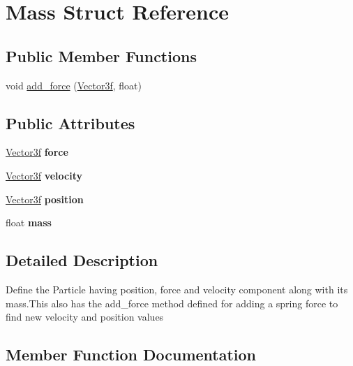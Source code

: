 \hypertarget{struct_mass}{}\section{Mass Struct Reference}
\label{struct_mass}
\subsection*{Public Member Functions}
\begin{DoxyCompactItemize}
\item 
void \mbox{\hyperlink{struct_mass_a7e47cabb99c2108fa6b5a8295967aa4f}{add\+\_\+force}} (\mbox{\hyperlink{class_vector3f}{Vector3f}}, float)
\end{DoxyCompactItemize}
\subsection*{Public Attributes}
\begin{DoxyCompactItemize}
\item 
\mbox{\label{struct_mass_a0c10550c393e04b31927ea2e19c79538}} 
\mbox{\hyperlink{class_vector3f}{Vector3f}} {\bfseries force}
\item 
\mbox{\label{struct_mass_a971611e5f9a951b0d4334d960386a900}} 
\mbox{\hyperlink{class_vector3f}{Vector3f}} {\bfseries velocity}
\item 
\mbox{\label{struct_mass_a7e002d5ca8f425d06f4fe8a0c7f87ab3}} 
\mbox{\hyperlink{class_vector3f}{Vector3f}} {\bfseries position}
\item 
\mbox{\label{struct_mass_ad42ebf0aa60e00964bec1622ee4abad8}} 
float {\bfseries mass}
\end{DoxyCompactItemize}


\subsection{Detailed Description}
Define the Particle having position, force and velocity component along with its mass.\+This also has the add\+\_\+force method defined for adding a spring force to find new velocity and position values 

\subsection{Member Function Documentation}
\mbox{\label{struct_mass_a7e47cabb99c2108fa6b5a8295967aa4f}} 
